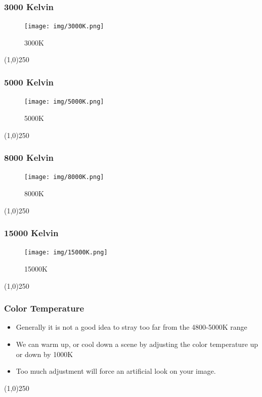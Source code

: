 \begin{frame}
\frametitle{3000 Kelvin}
\begin{figure}
	\centering
		\texttt{[image: img/3000K.png]}
	\caption{3000K}
	\label{fig:colortemp3000}
\end{figure}
\end{frame}
\begin{center}\line(1,0){250}\end{center}


\begin{frame}
\frametitle{5000 Kelvin}
\begin{figure}
	\centering
		\texttt{[image: img/5000K.png]}
	\caption{5000K}
	\label{fig:colortemp5000}
\end{figure}
\end{frame}
\begin{center}\line(1,0){250}\end{center}

\begin{frame}
\frametitle{8000 Kelvin}
\begin{figure}
	\centering
		\texttt{[image: img/8000K.png]}
	\caption{8000K}
	\label{fig:colortemp8000}
\end{figure}
\end{frame}
\begin{center}\line(1,0){250}\end{center}

\begin{frame}
\frametitle{15000 Kelvin}
\begin{figure}
	\centering
		\texttt{[image: img/15000K.png]}
	\caption{15000K}
	\label{fig:colortemp15000}
\end{figure}
\end{frame}
\begin{center}\line(1,0){250}\end{center}

\begin{frame}
\frametitle{Color Temperature}
\begin{itemize}
	\item Generally it is not a good idea to stray too far from the 4800-5000K range
	\item We can warm up, or cool down a scene by adjusting the color temperature up or down by 1000K
	\item Too much adjustment will force an artificial look on your image.
\end{itemize}
\end{frame}
\begin{center}\line(1,0){250}\end{center}




